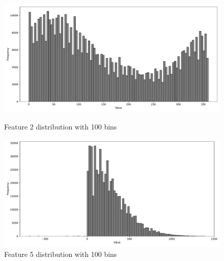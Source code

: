\documentclass[11pt]{article}
\begin{document}
\begin{figure}[H]
	\centering
	\begin{minipage}[t]{0.48\textwidth}
		\centering
		\includegraphics[width=\textwidth]{images/2_distribution.pdf}
		\caption{Feature 2 distribution with 100 bins}
		\label{fig:f2}
	\end{minipage}
	\hfill
	\begin{minipage}[t]{0.48\textwidth}
		\centering
		\includegraphics[width=\textwidth]{images/5_distribution.pdf}
		\caption{Feature 5 distribution with 100 bins}
		\label{fig:f5}
	\end{minipage}
	


\end{figure}
\end{document}
